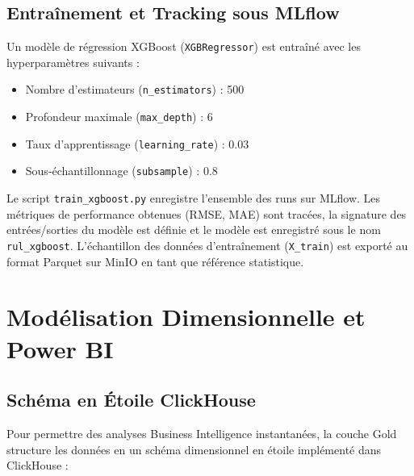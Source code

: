 \documentclass[12pt]{report}
\begin{document}
\section{Entraînement et Tracking sous MLflow}
Un modèle de régression XGBoost (\texttt{XGBRegressor}) est entraîné avec les hyperparamètres suivants :
\begin{itemize}
    \item Nombre d'estimateurs (\texttt{n\_estimators}) : 500
    \item Profondeur maximale (\texttt{max\_depth}) : 6
    \item Taux d'apprentissage (\texttt{learning\_rate}) : 0.03
    \item Sous-échantillonnage (\texttt{subsample}) : 0.8
\end{itemize}

Le script \texttt{train\_xgboost.py} enregistre l'ensemble des runs sur MLflow. Les métriques de performance obtenues (RMSE, MAE) sont tracées, la signature des entrées/sorties du modèle est définie et le modèle est enregistré sous le nom \texttt{rul\_xgboost}. L'échantillon des données d'entraînement (\texttt{X\_train}) est exporté au format Parquet sur MinIO en tant que référence statistique.


\chapter{Modélisation Dimensionnelle et Power BI}

\section{Schéma en Étoile ClickHouse}
Pour permettre des analyses Business Intelligence instantanées, la couche Gold structure les données en un schéma dimensionnel en étoile implémenté dans ClickHouse :
\end{document}
